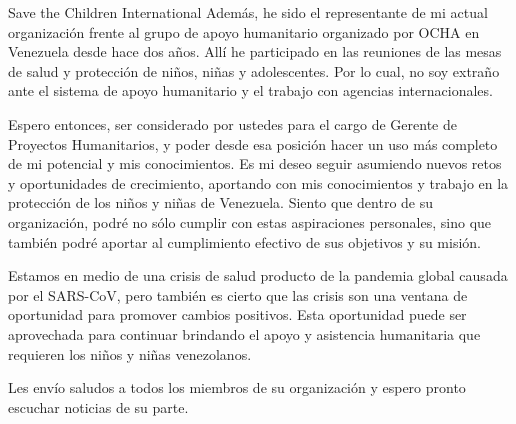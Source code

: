 \documentclass[draft=false]{scrlttr2}
\begin{document}
\begin{letter}{Save the Children International}
Además, he sido el representante de mi actual organización frente al grupo de apoyo humanitario organizado por OCHA en Venezuela desde hace dos años.
Allí he participado en las reuniones de las mesas de salud y protección de niños, niñas y adolescentes.
Por lo cual, no soy extraño ante el sistema de apoyo humanitario y el trabajo con agencias internacionales.

Espero entonces, ser considerado por ustedes para el cargo de Gerente de Proyectos Humanitarios, y poder desde esa posición hacer un uso más completo de mi potencial y mis conocimientos.
Es mi deseo seguir asumiendo nuevos retos y oportunidades de crecimiento, aportando con mis conocimientos y trabajo en la protección de los niños y niñas de Venezuela.
Siento que dentro de su organización, podré no sólo cumplir con estas aspiraciones personales, sino que también podré aportar al cumplimiento efectivo de sus objetivos y su misión.

Estamos en medio de una crisis de salud producto de la pandemia global causada por el SARS\nobreakdash-CoV, pero también es cierto que las crisis son una ventana de oportunidad para promover cambios positivos.
Esta oportunidad puede ser aprovechada para continuar brindando el apoyo y asistencia humanitaria que requieren los niños y niñas venezolanos.

%
%
%
%
%
%
%
%
\closing{Les envío saludos a todos los miembros de su organización y espero pronto escuchar noticias de su parte.}
    \end{letter}
\end{document}
